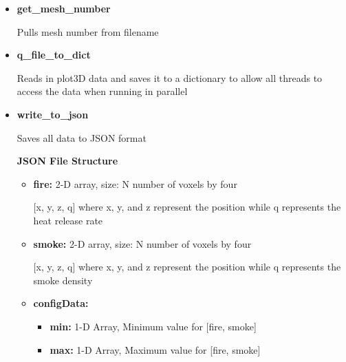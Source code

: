 \begin{itemize}
    \item \textbf{get\_mesh\_number}
    \item[] Pulls mesh number from filename

    \item \textbf{q\_file\_to\_dict}
    \item[] Reads in plot3D data and saves it to a dictionary to allow all threads to access the data when running in parallel 

    \item \textbf{write\_to\_json}
    \item[] Saves all data to JSON format
        \item[] \textbf{JSON File Structure}   
                \begin{itemize}
                \item\textbf{fire:} 2-D array, size: N {number of voxels}  by four
                \item[] [x, y, z, q] where x, y, and z represent the position while q represents the heat release rate
                \item\textbf{smoke:} 2-D array, size: N {number of voxels}  by four
                \item[] [x, y, z, q] where x, y, and z represent the position while q represents the smoke density
                \item\textbf{configData:}
                \begin{itemize}
                    \item\textbf{min:} 1-D Array, Minimum value for [fire, smoke]
                    \item\textbf{max:} 1-D Array, Maximum value for [fire, smoke]
                \end{itemize} 
    

\end{itemize}
\end{itemize}
